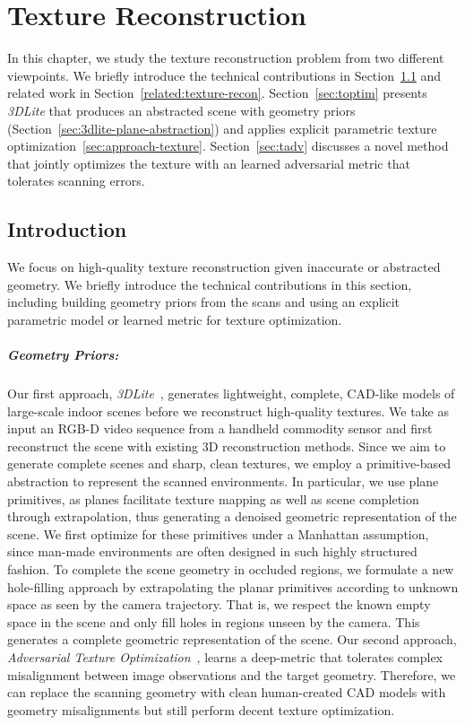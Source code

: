 \chapter{Texture Reconstruction}
\label{chapter:texture-recon}
In this chapter, we study the texture reconstruction problem from two different viewpoints. We briefly introduce the technical contributions in Section~\ref{sec:texturerecon-intro} and related work in Section~\ref{related:texture-recon}. Section~\ref{sec:toptim} presents \emph{3DLite} that produces an abstracted scene with geometry priors (Section~\ref{sec:3dlite-plane-abstraction}) and applies explicit parametric texture optimization~\ref{sec:approach-texture}. Section~\ref{sec:tadv} discusses a novel method that jointly optimizes the texture with an learned adversarial metric that tolerates scanning errors.

\section{Introduction}
\label{sec:texturerecon-intro}
We focus on high-quality texture reconstruction given inaccurate or abstracted geometry. We briefly introduce the technical contributions in this section, including building geometry priors from the scans and using an explicit parametric model or learned metric for texture optimization.

\paragraph*{Geometry Priors:}
Our first approach, \emph{3DLite}~\cite{huang20173dlite}, generates lightweight, complete, CAD-like models of large-scale indoor scenes before we reconstruct high-quality textures.
%
We take as input an RGB-D video sequence from a handheld commodity sensor and first reconstruct the scene with existing 3D reconstruction methods.
Since we aim to generate complete scenes and sharp, clean textures, we employ a primitive-based abstraction to represent the scanned environments.
In particular, we use plane primitives, as planes facilitate texture mapping as well as scene completion through extrapolation, thus generating a denoised geometric representation of the scene.
%
We first optimize for these primitives under a Manhattan assumption, since man-made environments are often designed in such highly structured fashion.
To complete the scene geometry in occluded regions, we formulate a new hole-filling approach by extrapolating the planar primitives according to unknown space as seen by the camera trajectory.
That is, we respect the known empty space in the scene and only fill holes in regions unseen by the camera.
This generates a complete geometric representation of the scene.
%
Our second approach, \emph{Adversarial Texture Optimization}~\cite{huang2020adversarial}, learns a deep-metric that tolerates complex misalignment between image observations and the target geometry. Therefore, we can replace the scanning geometry with clean human-created CAD models with geometry misalignments but still perform decent texture optimization.

